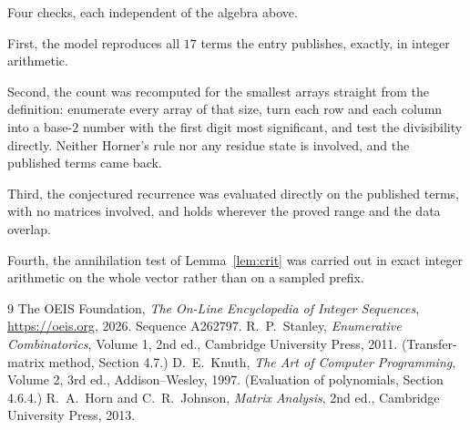 \documentclass[11pt,a4paper]{article}
\theoremstyle{plain}
\theoremstyle{definition}
\begin{document}
Four checks, each independent of the algebra above.

First, the model reproduces all $17$ terms the entry publishes, exactly, in integer
arithmetic.

Second, the count was recomputed for the smallest arrays straight from the definition:
enumerate every array of that size, turn each row and each column into a base-$2$ number with
the first digit most significant, and test the divisibility directly. Neither Horner's rule nor
any residue state is involved, and the published terms came back.

Third, the conjectured recurrence was evaluated directly on the published terms, with no
matrices involved, and holds wherever the proved range and the data overlap.

Fourth, the annihilation test of Lemma~\ref{lem:crit} was carried out in exact integer
arithmetic on the whole vector rather than on a sampled prefix.

\begin{thebibliography}{9}
 The OEIS Foundation, \emph{The On-Line Encyclopedia of Integer
Sequences}, \url{https://oeis.org}, 2026. Sequence A262797.
 R.~P.~Stanley, \emph{Enumerative Combinatorics}, Volume 1, 2nd ed.,
Cambridge University Press, 2011. (Transfer-matrix method, Section 4.7.)
 D.~E.~Knuth, \emph{The Art of Computer Programming}, Volume 2, 3rd ed.,
Addison--Wesley, 1997. (Evaluation of polynomials, Section 4.6.4.)
 R.~A.~Horn and C.~R.~Johnson, \emph{Matrix Analysis}, 2nd ed., Cambridge
University Press, 2013.
\end{thebibliography}
\end{document}
